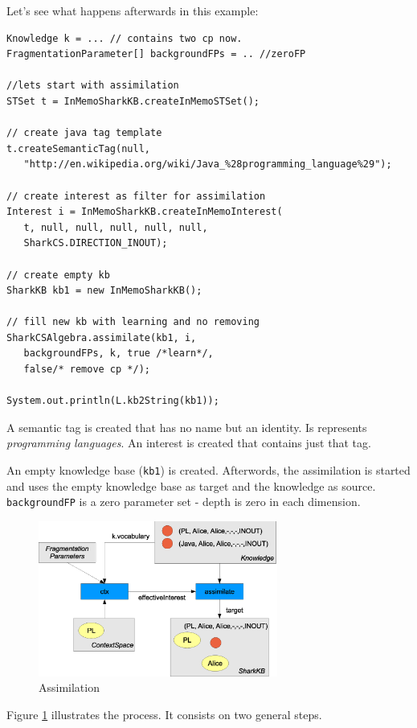 Let's see what happens afterwards in this example:

\begin{verbatim}
Knowledge k = ... // contains two cp now.
FragmentationParameter[] backgroundFPs = .. //zeroFP

//lets start with assimilation
STSet t = InMemoSharkKB.createInMemoSTSet();

// create java tag template
t.createSemanticTag(null, 
   "http://en.wikipedia.org/wiki/Java_%28programming_language%29");

// create interest as filter for assimilation
Interest i = InMemoSharkKB.createInMemoInterest(
   t, null, null, null, null, null, 
   SharkCS.DIRECTION_INOUT);

// create empty kb
SharkKB kb1 = new InMemoSharkKB();

// fill new kb with learning and no removing
SharkCSAlgebra.assimilate(kb1, i, 
   backgroundFPs, k, true /*learn*/, 
   false/* remove cp */);

System.out.println(L.kb2String(kb1));

\end{verbatim}

A semantic tag is created that has no name but an identity. Is represents {\it programming languages}. An interest is created that contains just that tag.

An empty knowledge base ({\tt kb1}) is created. Afterwords, the assimilation is started and uses the empty knowledge base as target and the knowledge as source. 
{\tt backgroundFP} is a zero parameter set - depth is zero in each dimension.

\begin{figure}[t]
\centering
\includegraphics[width=0.70\textwidth]{assimilation.eps}
\caption{Assimilation}
\label{fig:assimilation}
\end{figure}

Figure \ref{fig:assimilation} illustrates the process. It consists on two general steps.

